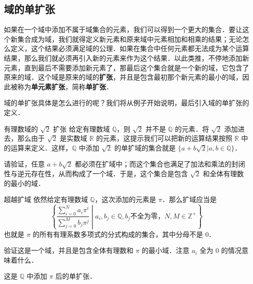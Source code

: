 
\begin{issues}
\end{issues}



\subsection{域的单扩张}
如果在一个域中添加不属于域集合的元素，我们可以得到一个更大的集合．要让这个新集合成为域，我们就得定义新元素和原来域中元素相加和相乘的结果；无论怎么定义，这个结果必须满足域的公理．如果在集合中任何元素都无法成为某个运算结果，那么我们就必须再引入新的元素来作为这个结果．以此类推，不停地添加新元素，直到最后不需要添加新元素了，那最后这个集合就是一个新的域，它包含了原来的域．这个域是原来的域的\textbf{扩张}，并且是包含最初那个新元素的最小的域，因此被称为\textbf{单元素扩张}，简称\textbf{单扩张}．

域的单扩张具体是怎么进行的呢？我们将从例子开始说明，最后引入域的单扩张的定义．

\begin{exercise}{有理数域的 $\sqrt{2}$ 扩张}\label{FldExp_exe1}
给定有理数域 $\mathbb{Q}$，则 $\sqrt{2}$ 并不是 $\mathbb{Q}$ 的元素．将 $\sqrt{2}$ 添加进去，那么由于 $\sqrt{2}$ 是实数域 $\mathbb{R}$ 的元素，这提示我们可以把新的运算结果按照 $\mathbb{R}$ 中的运算来定义．这样，$\mathbb{Q}$ 中添加 $\sqrt{2}$ 的单扩域的集合就是 $\{a+b\sqrt{2}|a, b\in\mathbb{Q}\}$．

请验证，任意 $a+b\sqrt{2}$ 都必须在扩域中；而这个集合也满足了加法和乘法的封闭性与逆元存在性，从而构成了一个域．于是，这个集合是包含 $\sqrt{2}$ 和全体有理数的最小的域．
\end{exercise}

\begin{exercise}{超越扩域}\label{FldExp_exe2}
依然给定有理数域 $\mathbb{Q}$，这次添加的元素是 $\pi$．那么扩域应当是
\begin{equation}
\left\{ \frac{\sum_{i=0}^N a_i\pi^i}{\sum_{j=0}^M b_j\pi^j} \middle| a_i, b_j\in\mathbb{Q}, b_j\text{不全为零，} N, M\in\mathbb{Z}^+ \right\}
\end{equation}
也就是 $\pi$ 的所有有理系数多项式的分式构成的集合，其中分母不是 $0$．

验证这是一个域，并且是包含全体有理数和 $\pi$ 的最小域．注意 $a_i$ 全为 $0$ 的情况意味着什么．

这是 $\mathbb{Q}$ 中添加 $\pi$ 后的单扩张．
\end{exercise}



